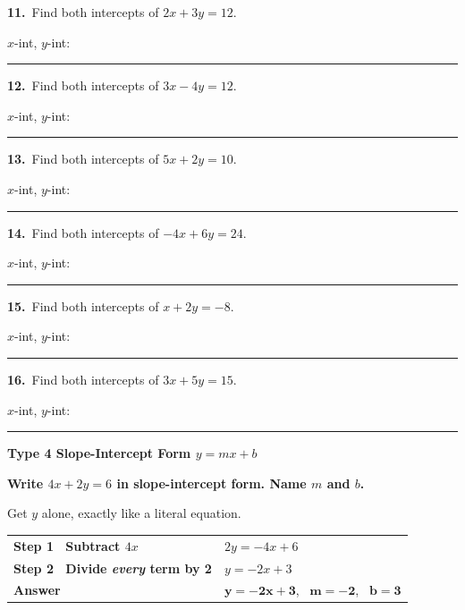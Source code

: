 \documentclass[11pt,letterpaper]{article}
\newcommand{\topicbar}[1]{\needspace{4.5cm}\par\vspace{5mm}
  \begin{tcolorbox}[enhanced,colback=fmtitle,colframe=fmtitle,arc=2mm,left=4mm,top=1.5mm,bottom=1.5mm]
  \color{white}\bfseries\large #1
  \end{tcolorbox}}
\begin{document}
\needspace{3.1cm}\par\vspace{3mm}\noindent \begin{minipage}[t][2.6cm]{0.48\linewidth}\raggedright{\color{fmturn}\bfseries 11.}\ Find both intercepts of $2x + 3y = 12$.\par\vfill\hfill $x$-int, $y$-int:\ \rule{3.2cm}{0.4pt}\end{minipage}\hfill \begin{minipage}[t][2.6cm]{0.48\linewidth}\raggedright{\color{fmturn}\bfseries 12.}\ Find both intercepts of $3x - 4y = 12$.\par\vfill\hfill $x$-int, $y$-int:\ \rule{3.2cm}{0.4pt}\end{minipage}\par
\needspace{3.1cm}\par\vspace{3mm}\noindent \begin{minipage}[t][2.6cm]{0.48\linewidth}\raggedright{\color{fmturn}\bfseries 13.}\ Find both intercepts of $5x + 2y = 10$.\par\vfill\hfill $x$-int, $y$-int:\ \rule{3.2cm}{0.4pt}\end{minipage}\hfill \begin{minipage}[t][2.6cm]{0.48\linewidth}\raggedright{\color{fmturn}\bfseries 14.}\ Find both intercepts of $-4x + 6y = 24$.\par\vfill\hfill $x$-int, $y$-int:\ \rule{3.2cm}{0.4pt}\end{minipage}\par
\needspace{3.1cm}\par\vspace{3mm}\noindent \begin{minipage}[t][2.6cm]{0.48\linewidth}\raggedright{\color{fmturn}\bfseries 15.}\ Find both intercepts of $x + 2y = -8$.\par\vfill\hfill $x$-int, $y$-int:\ \rule{3.2cm}{0.4pt}\end{minipage}\hfill \begin{minipage}[t][2.6cm]{0.48\linewidth}\raggedright{\color{fmturn}\bfseries 16.}\ Find both intercepts of $3x + 5y = 15$.\par\vfill\hfill $x$-int, $y$-int:\ \rule{3.2cm}{0.4pt}\end{minipage}\par
\needspace{9cm}\topicbar{Type 4 \quad Slope-Intercept Form $y = mx + b$}
\begin{watchme}\textbf{Write $4x + 2y = 6$ in slope-intercept form. Name $m$ and $b$.}\par\vspace{1mm}Get $y$ alone, exactly like a literal equation.\par\vspace{1mm}
\renewcommand{\arraystretch}{2.0}\begin{tabular}{@{}l l@{}}
\textbf{Step 1 \ Subtract $4x$} & $2y = -4x + 6$\\
\textbf{Step 2 \ Divide \emph{every} term by 2} & $y = -2x + 3$\\
\textbf{Answer} & $\boldsymbol{y = -2x + 3}$, \ $\boldsymbol{m = -2}$, \ $\boldsymbol{b = 3}$
\end{tabular}\end{watchme}
\end{document}

